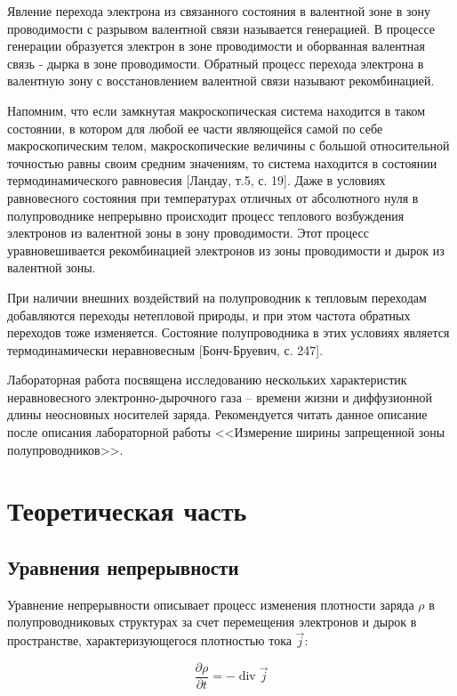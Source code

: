 \documentclass[a4paper,12pt]{article}
\begin{document}
Явление перехода электрона из связанного состояния в валентной зоне в зону проводимости с разрывом валентной связи называется генерацией. В процессе генерации образуется электрон в зоне проводимости и оборванная валентная связь - дырка в зоне проводимости. Обратный процесс перехода электрона в валентную зону с восстановлением валентной связи называют рекомбинацией.

Напомним, что если замкнутая макроскопическая система находится в таком состоянии, в котором для любой ее части являющейся самой по себе макроскопическим телом, макроскопические величины с большой относительной точностью равны своим средним значениям, то система находится в состоянии термодинамического равновесия [Ландау, т.5, с. 19]. Даже в условиях равновесного состояния при температурах отличных от абсолютного нуля в полупроводнике непрерывно происходит процесс теплового возбуждения электронов из валентной зоны в зону проводимости. Этот процесс уравновешивается рекомбинацией электронов из зоны проводимости и дырок из валентной зоны.

При наличии внешних воздействий на полупроводник к тепловым переходам добавляются переходы нетепловой природы, и при этом частота обратных переходов тоже изменяется. Состояние полупроводника в этих условиях является термодинамически неравновесным [Бонч-Бруевич, с. 247].

Лабораторная работа посвящена исследованию нескольких характеристик неравновесного электронно-дырочного газа -- времени жизни и диффузионной длины неосновных носителей заряда. Рекомендуется читать данное описание после описания лабораторной работы <<Измерение ширины запрещенной зоны полупроводников>>.

\section{Теоретическая часть}
\subsection{Уравнения непрерывности}

Уравнение непрерывности описывает процесс изменения плотности заряда $\rho$ в полупроводниковых структурах за счет перемещения электронов и дырок в пространстве, характеризующегося плотностью тока $\vec{j}$:

\begin{equation}
	\label{eq1}
	\frac{\partial \rho}{\partial t}=-\operatorname{div} \vec{j}
\end{equation}
\end{document}

